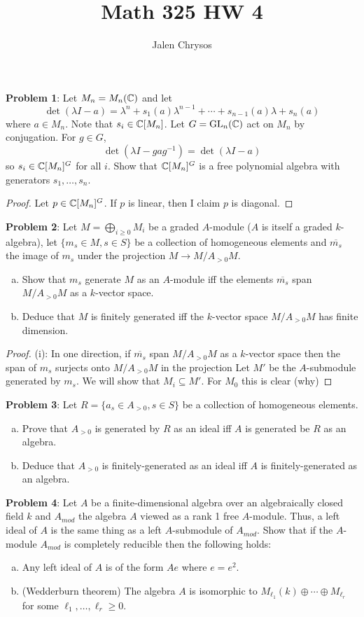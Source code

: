 \documentclass{amsart}
\title{Math 325 HW 4}
\author{Jalen Chrysos}
\begin{document}
	\textbf{Problem 1}: Let $M_n=M_n(\mathbb{C})$ and let 
	$$
	\det(\lambda I - a) = \lambda^n + s_1(a)\lambda^{n-1} + \cdots + s_{n-1}(a)\lambda + s_n(a)
	$$
	where $a\in M_n$. Note that $s_i\in \mathbb{C}[M_n]$. Let $G=\operatorname{GL}_n(\mathbb{C})$ act on $M_n$ by conjugation. For $g\in G$, 
	$$
	\det(\lambda I - gag^{-1}) = \det(\lambda I - a)
	$$
	so $s_i\in \mathbb{C}[M_n]^G$ for all $i$. Show that $\mathbb{C}[M_n]^G$ is a free polynomial algebra with generators $s_1,\dots,s_n$. \\
	
	\begin{proof}
		Let $p\in \mathbb{C}[M_n]^G$. If $p$ is linear, then I claim $p$ is diagonal.
	\end{proof}
	
	\newpage 
	
	\textbf{Problem 2}: Let $M = \bigoplus_{i\geq 0} M_i$ be a graded $A$-module ($A$ is itself a graded $k$-algebra), let $\{m_s\in M, s\in S\}$ be a collection of homogeneous elements and $\overline{m_s}$ the image of $m_s$ under the projection $M\to M/A_{>0}M$.
	\begin{enumerate}[(a)]
		\item Show that $m_s$ generate $M$ as an $A$-module iff the elements $\overline{m_s}$ span $M/A_{>0}M$ as a $k$-vector space. 
		\item Deduce that $M$ is finitely generated iff the $k$-vector space $M/A_{>0}M$ has finite dimension.
	\end{enumerate}
	\begin{proof}
		(i): In one direction, if $\overline{m_s}$ span $M/A_{>0} M$ as a $k$-vector space then the span of $m_s$ surjects onto $M/A_{>0}M$ in the projection Let $M'$ be the $A$-submodule generated by $m_s$. We will show that $M_i\subseteq M'$. For $M_0$ this is clear (why)
	\end{proof}
	
	\newpage
	\textbf{Problem 3}: Let $R= \{a_s \in A_{>0}, s\in S\}$ be a collection of homogeneous elements.
	\begin{enumerate}[(a)]
		\item Prove that $A_{>0}$ is generated by $R$ as an ideal iff $A$ is generated be $R$ as an algebra.
		\item Deduce that $A_{>0}$ is finitely-generated as an ideal iff $A$ is finitely-generated as an algebra.
	\end{enumerate}
	
	\newpage
	\textbf{Problem 4}: Let $A$ be a finite-dimensional algebra over an algebraically closed field $k$ and $A_{mod}$ the algebra $A$ viewed as a rank 1 free $A$-module. Thus, a left ideal of $A$ is the same thing as a left $A$-submodule of $A_{mod}$. Show that if the $A$-module $A_{mod}$ is completely reducible then the following holds:
	\begin{enumerate}[(a)]
		\item Any left ideal of $A$ is of the form $Ae$ where $e=e^2$. 
		\item (Wedderburn theorem) The algebra $A$ is isomorphic to $M_{\ell_1}(k)\oplus \cdots \oplus M_{\ell_r}$ for some $\ell_1,\dots,\ell_r\geq 0$.
	\end{enumerate}
	
\end{document}
